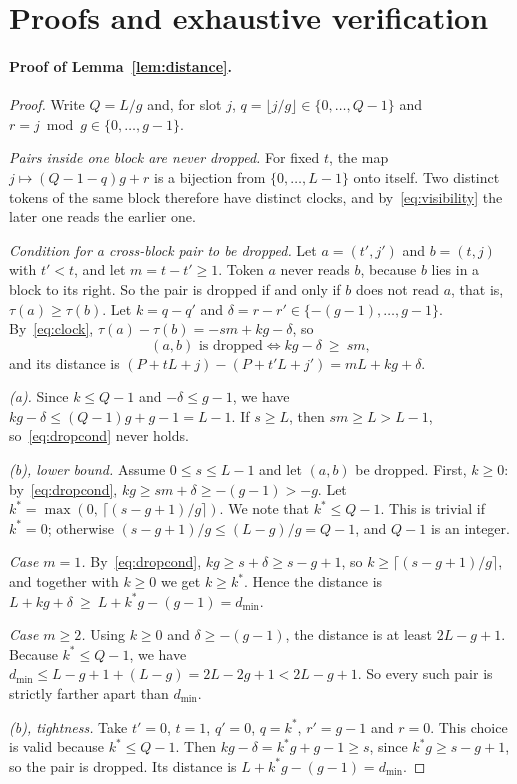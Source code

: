 \documentclass[11pt]{article}
\theoremstyle{definition}
\theoremstyle{remark}
\newcommand{\dmin}{d_{\min}}
\newcommand{\pos}[1]{\max\!\left(0,\,#1\right)}
\begin{document}



\appendix

\section{Proofs and exhaustive verification}
\label{app:proofs}
\label{app:verification}

\paragraph{Proof of Lemma~\ref{lem:distance}.}
\begin{proof}
Write $Q=L/g$ and, for slot $j$, $q=\lfloor j/g\rfloor\in\{0,\dots,Q-1\}$ and $r=j\bmod g\in\{0,\dots,g-1\}$.

\emph{Pairs inside one block are never dropped.}
For fixed $t$, the map $j\mapsto(Q-1-q)g+r$ is a bijection from $\{0,\dots,L-1\}$ onto itself.
Two distinct tokens of the same block therefore have distinct clocks, and by~\eqref{eq:visibility} the later one reads the earlier one.

\emph{Condition for a cross-block pair to be dropped.}
Let $a=(t',j')$ and $b=(t,j)$ with $t'<t$, and let $m=t-t'\ge1$.
Token $a$ never reads $b$, because $b$ lies in a block to its right.
So the pair is dropped if and only if $b$ does not read $a$, that is, $\tau(a)\ge\tau(b)$.
Let $k=q-q'$ and $\delta=r-r'\in\{-(g-1),\dots,g-1\}$.
By~\eqref{eq:clock}, $\tau(a)-\tau(b)=-sm+kg-\delta$, so
\begin{equation}
  \text{$(a,b)$ is dropped} \iff kg-\delta\ \ge\ sm,
  \label{eq:dropcond}
\end{equation}
and its distance is $(P+tL+j)-(P+t'L+j') = mL+kg+\delta$.

\emph{(a).}
Since $k\le Q-1$ and $-\delta\le g-1$, we have $kg-\delta\le (Q-1)g+g-1=L-1$.
If $s\ge L$, then $sm\ge L>L-1$, so~\eqref{eq:dropcond} never holds.

\emph{(b), lower bound.}
Assume $0\le s\le L-1$ and let $(a,b)$ be dropped.
First, $k\ge0$: by~\eqref{eq:dropcond}, $kg\ge sm+\delta\ge-(g-1)>-g$.
Let $k^\ast=\pos{\lceil (s-g+1)/g\rceil}$.
We note that $k^\ast\le Q-1$.
This is trivial if $k^\ast=0$; otherwise $(s-g+1)/g\le (L-g)/g=Q-1$, and $Q-1$ is an integer.

\emph{Case $m=1$.}
By~\eqref{eq:dropcond}, $kg\ge s+\delta\ge s-g+1$, so $k\ge\lceil (s-g+1)/g\rceil$, and together with $k\ge0$ we get $k\ge k^\ast$.
Hence the distance is $L+kg+\delta\ \ge\ L+k^\ast g-(g-1)=\dmin$.

\emph{Case $m\ge2$.}
Using $k\ge0$ and $\delta\ge-(g-1)$, the distance is at least $2L-g+1$.
Because $k^\ast\le Q-1$, we have $\dmin\le L-g+1+(L-g)=2L-2g+1<2L-g+1$.
So every such pair is strictly farther apart than $\dmin$.

\emph{(b), tightness.}
Take $t'=0$, $t=1$, $q'=0$, $q=k^\ast$, $r'=g-1$ and $r=0$.
This choice is valid because $k^\ast\le Q-1$.
Then $kg-\delta=k^\ast g+g-1\ge s$, since $k^\ast g\ge s-g+1$, so the pair is dropped.
Its distance is $L+k^\ast g-(g-1)=\dmin$.
\end{proof}
\end{document}
